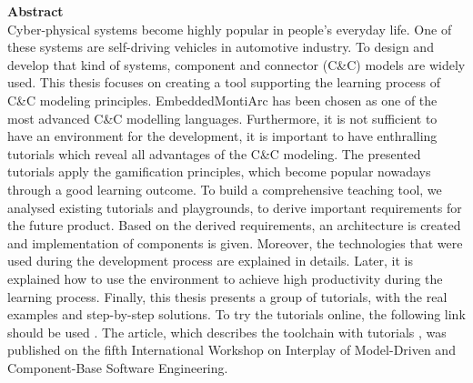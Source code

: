 \vspace*{2cm}

\vspace{10ex}
{\bf\Large Abstract} \\ [1em]
Cyber-physical systems become highly popular in people's everyday life. One of these systems are self-driving vehicles in automotive industry. To design and develop that kind of systems, component and connector (C\&C) models are widely used. This thesis focuses on creating a tool supporting the learning process of C\&C modeling principles. EmbeddedMontiArc has been chosen as one of the most advanced C\&C modelling languages. Furthermore, it is not sufficient to have an environment for the development, it is important to have enthralling tutorials which reveal all advantages of the C\&C modeling. The presented tutorials apply the gamification principles, which become popular nowadays through a good learning outcome. To build a comprehensive teaching tool, we analysed existing tutorials and playgrounds, to derive important requirements for the future product. Based on the derived requirements, an architecture is created and implementation of components is given. Moreover, the technologies that were used during the development process are explained in details. Later, it is explained how to use the environment to achieve high productivity during the learning process. Finally, this thesis presents a group of tutorials, with the real examples and step-by-step solutions. To try the tutorials online, the following link should be used \cite{OnlineExample}. The article, which describes the toolchain with tutorials \cite{TeachPlay}, was published on the fifth International Workshop on Interplay of Model-Driven and Component-Base Software Engineering.